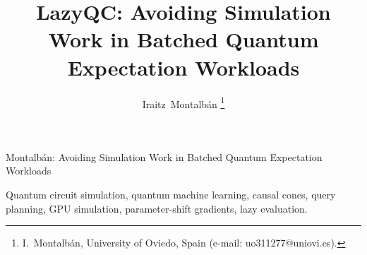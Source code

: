 \documentclass[journal]{IEEEtran}
\begin{document}
\title{LazyQC: Avoiding Simulation Work in Batched Quantum Expectation Workloads}

\author{Iraitz~Montalb\'an%
\thanks{I.~Montalb\'an, University of Oviedo, Spain (e-mail: uo311277@uniovi.es).}%
}

%
{Montalb\'an: Avoiding Simulation Work in Batched Quantum Expectation Workloads}

\maketitle

\begin{abstract}

\end{abstract}

\begin{IEEEkeywords}
Quantum circuit simulation, quantum machine learning, causal cones, query planning, GPU simulation, parameter-shift gradients, lazy evaluation.
\end{IEEEkeywords}













\end{document}
